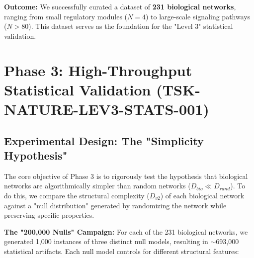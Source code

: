 \documentclass[11pt]{article}
\begin{document}
\textbf{Outcome:}
We successfully curated a dataset of \textbf{231 biological networks}, ranging from small regulatory modules ($N=4$) to large-scale signaling pathways ($N > 80$). This dataset serves as the foundation for the "Level 3" statistical validation.

\section{Phase 3: High-Throughput Statistical Validation (TSK-NATURE-LEV3-STATS-001)}
\subsection{Experimental Design: The "Simplicity Hypothesis"}
The core objective of Phase 3 is to rigorously test the hypothesis that biological networks are algorithmically simpler than random networks ($D_{bio} \ll D_{rand}$). To do this, we compare the structural complexity ($D_{v2}$) of each biological network against a "null distribution" generated by randomizing the network while preserving specific properties.

\textbf{The "200,000 Nulls" Campaign:}
For each of the 231 biological networks, we generated 1,000 instances of three distinct null models, resulting in $\sim$693,000 statistical artifacts. Each null model controls for different structural features:
\end{document}
